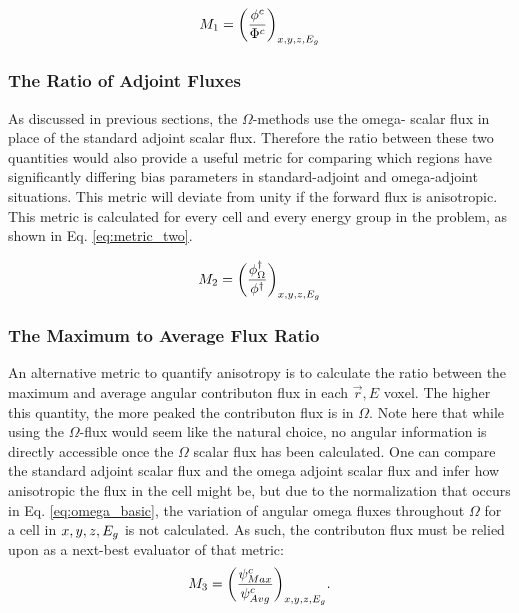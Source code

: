 \begin{equation}
  M_{1} = \bigg(\frac{\phi^{c}}{\Phi^{c}}\bigg)_{x,y,z,E_g}
  \label{eq:metric_one}
\end{equation}

\subsubsection{The Ratio of Adjoint Fluxes}

As discussed in previous sections, the $\Omega$-methods use the omega- scalar
flux in place of the standard adjoint scalar flux. Therefore the ratio between
these two quantities would also provide a useful metric for comparing which
regions have significantly differing bias parameters in standard-adjoint and
omega-adjoint situations. This metric will deviate from unity if the forward
flux is anisotropic. This metric is calculated for
every cell and every energy group in the problem, as shown in Eq.
\ref{eq:metric_two}.

\begin{equation}
  M_{2} = \bigg(\frac{\phi^{\dagger}_{\Omega}}{\phi^{\dagger}}\bigg)_{x,y,z,E_g}
  \label{eq:metric_two}
\end{equation}

\subsubsection{The Maximum to Average Flux Ratio}

An alternative metric to quantify anisotropy is to calculate the ratio between
the maximum and average angular contributon flux in each $\vec{r} , E$ voxel.
The higher this quantity, the more peaked the contributon flux is in $\Omega$.
Note here that while using the $\Omega$-flux would seem like the natural choice,
no angular information is directly accessible once the $\Omega$ scalar flux has
been calculated. One can compare the standard adjoint scalar flux and the omega
adjoint scalar flux and infer how anisotropic the flux in the cell might be, but
due to the normalization that occurs in Eq. \ref{eq:omega_basic}, the
variation of angular omega fluxes throughout $\Omega$ for a cell
in $x,y,z,E_g$ is not
calculated. As such, the contributon flux must be relied
upon as a next-best evaluator of that metric:
%
\begin{equation}
  M_{3} = \bigg(\frac{\psi^{c}_{Max}}{\psi^{c}_{
          Avg}}\bigg)_{x,y,z,E_g}  .
  \label{eq:metric_three}
\end{equation}

